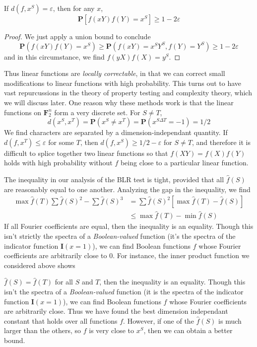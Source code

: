 \begin{theorem}
    If $d(f,x^S) = \varepsilon$, then for any $x$,
    \[ \mathbf{P}[f(xY)f(Y) = x^S] \geq 1 - 2 \varepsilon \]
\end{theorem}
\begin{proof}
    We just apply a union bound to conclude
    \[ \mathbf{P}(f(xY)f(Y) = x^S) \geq \mathbf{P}(f(xY) = x^SY^S, f(Y) = Y^S) \geq 1 - 2\varepsilon \]
    and in this circumstance, we find $f(yX)f(X) = y^S$.
\end{proof}

Thus linear functions are {\it locally correctable}, in that we can correct small modifications to linear functions with high probability. This turns out to have vast repurcussions in the theory of property testing and complexity theory, which we will discuss later. One reason why these methods work is that the linear functions on $\mathbf{F}_2^n$ form a very discrete set. For $S \neq T$,
%
\[ d(x^S,x^T) = \mathbf{P}(x^S \neq x^T) = \mathbf{P}(x^{S \Delta T} = -1) = 1/2 \]
%
We find characters are separated by a dimension-independant quantity. If $d(f,x^T) \leq \varepsilon$ for some $T$, then $d(f,x^S) \geq 1/2 - \varepsilon$ for $S \neq T$, and therefore it is difficult to splice together two linear functions so that $f(XY) = f(X)f(Y)$ holds with high probability without $f$ being close to a particular linear function.

The inequality in our analysis of the BLR test is tight, provided that all $\widehat{f}(S)$ are reasonably equal to one another. Analyzing the gap in the inequality, we find
%
\begin{align*}
    \max \widehat{f}(T) \sum \widehat{f}(S)^2 - \sum \widehat{f}(S)^3 &= \sum \widehat{f}(S)^2 [\max \widehat{f}(T) - \widehat{f}(S)]\\
    &\leq \max \widehat{f}(T) - \min \widehat{f}(S)
\end{align*}
%
If all Fourier coefficients are equal, then the inequality is an equality. Though this isn't strictly the spectra of a {\it Boolean-valued} function (it's the spectra of the indicator function $\mathbf{I}(x = 1)$), we can find Boolean functions $f$ whose Fourier coefficients are arbitrarily close to 0. For instance, the inner product function we considered above shows

$\widehat{f}(S) = \widehat{f}(T)$ for all $S$ and $T$, then the inequality is an equality. Though this isn't the spectra of a {\it Boolean-valued} function (it is the spectra of the indicator function $\mathbf{I}(x = 1)$), we can find Boolean functions $f$ whose Fourier coefficients are arbitrarily close. Thus we have found the best dimension independant constant that holds over all functions $f$. However, if one of the $\widehat{f}(S)$ is much larger than the others, so $f$ is very close to $x^S$, then we can obtain a better bound.

